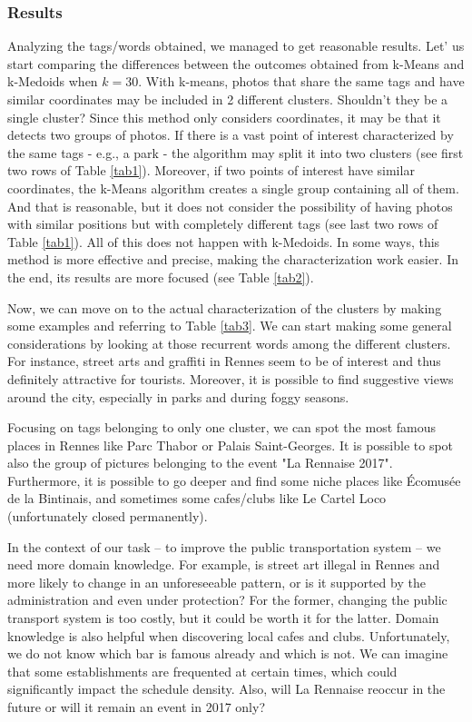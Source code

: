 \documentclass[runningheads]{llncs}
\begin{document}
\subsubsection{Results}
Analyzing the tags/words obtained, we managed to get reasonable results.  Let' us start comparing the differences between the outcomes obtained from k-Means and k-Medoids when $k=30$.  With k-means, photos that share the same tags and have similar coordinates may be included in 2 different clusters. Shouldn't they be a single cluster? Since this method only considers coordinates, it may be that it detects two groups of photos. If there is a vast point of interest characterized by the same tags - e.g., a park - the algorithm may split it into two clusters (see first two rows of Table \ref{tab1}). 
Moreover, if two points of interest have similar coordinates, the k-Means algorithm creates a single group containing all of them. And that is reasonable, but it does not consider the possibility of having photos with similar positions but with completely different tags (see last two rows of Table \ref{tab1}).
All of this does not happen with k-Medoids. In some ways, this method is more effective and precise, making the characterization work easier. In the end, its results are more focused (see Table \ref{tab2}).

Now, we can move on to the actual characterization of the clusters by making some examples and referring to Table \ref{tab3}. We can start making some general considerations by looking at those recurrent words among the different clusters. For instance, street arts and graffiti in Rennes seem to be of interest and thus definitely attractive for tourists. Moreover, it is possible to find suggestive views around the city, especially in parks and during foggy seasons.

Focusing on tags belonging to only one cluster, we can spot the most famous places in Rennes like Parc Thabor or Palais Saint-Georges. It is possible to spot also the group of pictures belonging to the event "La Rennaise 2017". Furthermore, it is possible to go deeper and find some niche places like Écomusée de la Bintinais, and sometimes some cafes/clubs like Le Cartel Loco (unfortunately closed permanently).

In the context of our task – to improve the public transportation system – we need more domain knowledge. For example, is street art illegal in Rennes and more likely to change in an unforeseeable pattern, or is it supported by the administration and even under protection? For the former, changing the public transport system is too costly, but it could be worth it for the latter. Domain knowledge is also helpful when discovering local cafes and clubs. Unfortunately, we do not know which bar is famous already and which is not. We can imagine that some establishments are frequented at certain times, which could significantly impact the schedule density. Also, will La Rennaise reoccur in the future or will it remain an event in 2017 only?
\end{document}

